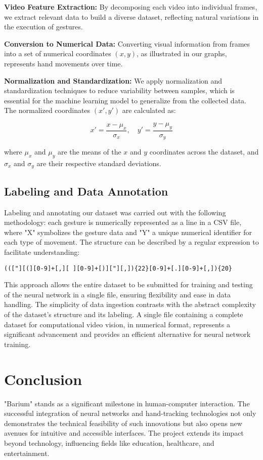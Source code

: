 \documentclass{article}
\begin{document}
\textbf{Video Feature Extraction:} By decomposing each video into individual frames, we extract relevant data to build a diverse dataset, reflecting natural variations in the execution of gestures.

\textbf{Conversion to Numerical Data:} Converting visual information from frames into a set of numerical coordinates $(x, y)$, as illustrated in our graphs, represents hand movements over time.

\textbf{Normalization and Standardization:} We apply normalization and standardization techniques to reduce variability between samples, which is essential for the machine learning model to generalize from the collected data. The normalized coordinates $(x', y')$ are calculated as:

\begin{equation}
x' = \frac{x - \mu_x}{\sigma_x}, \quad y' = \frac{y - \mu_y}{\sigma_y}
\end{equation}

where $\mu_x$ and $\mu_y$ are the means of the $x$ and $y$ coordinates across the dataset, and $\sigma_x$ and $\sigma_y$ are their respective standard deviations.


\subsection{Labeling and Data Annotation}

Labeling and annotating our dataset was carried out with the following methodology: each gesture is numerically represented as a line in a CSV file, where "X" symbolizes the gesture data and "Y" a unique numerical identifier for each type of movement. The structure can be described by a regular expression to facilitate understanding:

\begin{verbatim}
((["][(][0-9]+[,][ ][0-9]+[)]["][,]){22}[0-9]+[.][0-9]+[,]){20}
\end{verbatim}

This approach allows the entire dataset to be submitted for training and testing of the neural network in a single file, ensuring flexibility and ease in data handling. The simplicity of data ingestion contrasts with the abstract complexity of the dataset's structure and its labeling. A single file containing a complete dataset for computational video vision, in numerical format, represents a significant advancement and provides an efficient alternative for neural network training.

\section{Conclusion}
"Barium" stands as a significant milestone in human-computer interaction. The successful integration of neural networks and hand-tracking technologies not only demonstrates the technical feasibility of such innovations but also opens new avenues for intuitive and accessible interfaces. The project extends its impact beyond technology, influencing fields like education, healthcare, and entertainment.



\end{document}
